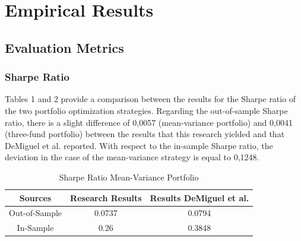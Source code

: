 \documentclass{article}
\begin{document}
\section{Empirical Results}
\subsection{Evaluation Metrics}
\subsubsection{Sharpe Ratio}
Tables 1 and 2 provide a comparison between the results for the Sharpe ratio of the two portfolio optimization strategies. Regarding the out-of-sample Sharpe ratio, there is a slight difference of 0,0057 (mean-variance portfolio) and 0,0041 (three-fund portfolio) between the results that this research yielded and that DeMiguel et al. \cite{DEM09} reported. With respect to the in-sample Sharpe ratio, the deviation in the case of the mean-variance strategy is equal to 0,1248.
\begin{table}[H]
\begin{center}
\begin{tabular}{ccc}
\hline \hline
Sources & Research Results & Results DeMiguel et al. \cite{DEM09}\\
\hline
\toprule
Out-of-Sample & 0.0737  & 0.0794 \\
In-Sample & 0.26  & 0.3848 \\
\hline \hline
\end{tabular}
\caption {Sharpe Ratio Mean-Variance Portfolio}
\end{center}
\end{table}
\end{document}
